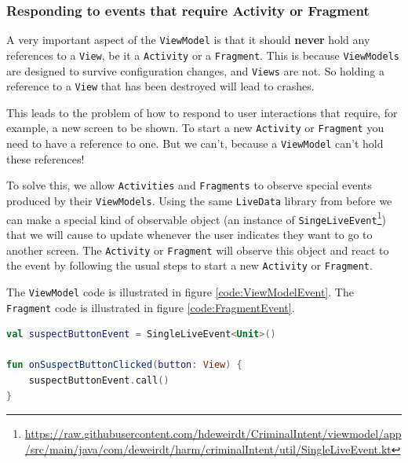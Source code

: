 

\subsubsection{Responding to events that require Activity or Fragment}
A very important aspect of the \lstinline!ViewModel! is that it should \textbf{never} hold any references to a \lstinline!View!, be it a \lstinline!Activity! or a \lstinline!Fragment!.
This is because \lstinline!ViewModels! are designed to survive configuration changes, and \lstinline!Views! are not.
So holding a reference to a \lstinline!View! that has been destroyed will lead to crashes. 

This leads to the problem of how to respond to user interactions that require, for example, a new screen to be shown.
To start a new \lstinline!Activity! or \lstinline!Fragment! you need to have a reference to one.
But we can't, because a \lstinline!ViewModel! can't hold these references!

To solve this, we allow \lstinline!Activities! and \lstinline!Fragments! to observe special events produced by their \lstinline!ViewModels!.
Using the same \lstinline!LiveData! library from before we can make a special kind of observable object 
(an instance of \lstinline!SingeLiveEvent!\footnote{\url{https://raw.githubusercontent.com/hdeweirdt/CriminalIntent/viewmodel/app/src/main/java/com/deweirdt/harm/criminalIntent/util/SingleLiveEvent.kt}}) 
that we will cause to update whenever the user indicates they want to go to another screen.
The \lstinline!Activity! or \lstinline!Fragment! will observe this object and react to the event by following the usual steps to start a new \lstinline!Activity! or \lstinline!Fragment!.

The \lstinline!ViewModel! code is illustrated in figure \ref{code:ViewModelEvent}.
The \lstinline!Fragment! code is illustrated in figure \ref{code:FragmentEvent}.
	
\begin{lstlisting}[language=Kotlin, label=code:ViewModelEvent,
caption={The \lstinline!ViewModel! has one \lstinline!SingeLiveEvent! for each interaction that eventually requires action from a \lstinline!Activity! or \lstinline!Fragment!.
The \lstinline!onButtonClicked! functions are referenced in the layout files.}]
val suspectButtonEvent = SingleLiveEvent<Unit>()

fun onSuspectButtonClicked(button: View) {
	suspectButtonEvent.call()
}
\end{lstlisting}

